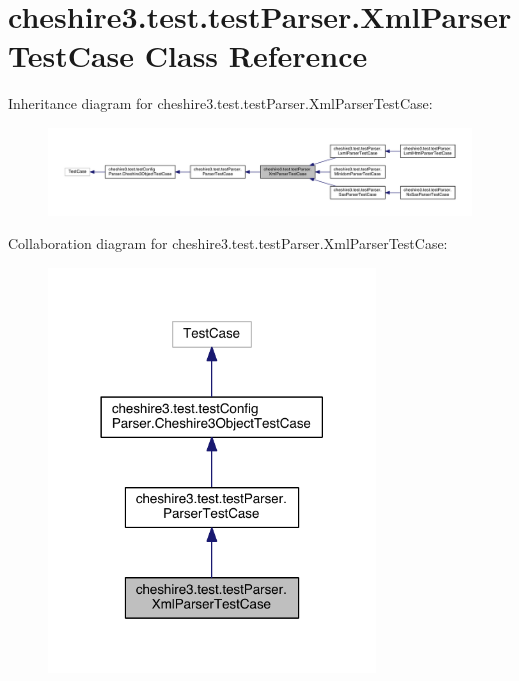 \hypertarget{classcheshire3_1_1test_1_1test_parser_1_1_xml_parser_test_case}{\section{cheshire3.\-test.\-test\-Parser.\-Xml\-Parser\-Test\-Case Class Reference}
\label{classcheshire3_1_1test_1_1test_parser_1_1_xml_parser_test_case}
}


Inheritance diagram for cheshire3.\-test.\-test\-Parser.\-Xml\-Parser\-Test\-Case\-:
\nopagebreak
\begin{figure}[H]
\begin{center}
\leavevmode
\includegraphics[width=350pt]{classcheshire3_1_1test_1_1test_parser_1_1_xml_parser_test_case__inherit__graph}
\end{center}
\end{figure}


Collaboration diagram for cheshire3.\-test.\-test\-Parser.\-Xml\-Parser\-Test\-Case\-:
\nopagebreak
\begin{figure}[H]
\begin{center}
\leavevmode
\includegraphics[width=246pt]{classcheshire3_1_1test_1_1test_parser_1_1_xml_parser_test_case__coll__graph}
\end{center}
\end{figure}
